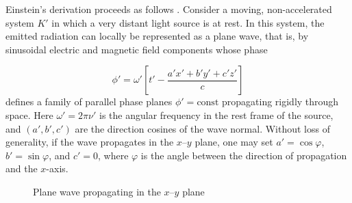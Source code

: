 \documentclass[submitted,12pt]{article} %
\begin{document}
Einstein’s derivation proceeds as follows \citep[910\psq]{Einstein1905}. Consider a moving, non-accelerated system $K'$ in which a very distant light source is at rest. In this system, the emitted radiation can locally be represented as a plane wave, that is, by sinusoidal electric and magnetic field components whose phase

\begin{equation*}
\phi'=\omega'\!\left[t'-\frac{a' x'+b' y'+c' z'}{c}\right]
\end{equation*}
defines a family of parallel phase planes $\phi'=\text{const}$ propagating rigidly through space. Here $\omega'=2\pi\nu'$ is the angular frequency in the rest frame of the source, and $(a',b',c')$ are the direction cosines of the wave normal. Without loss of generality, if the wave propagates in the $x$--$y$ plane, one may set $a'=\cos\varphi$, $b'=\sin\varphi$, and $c'=0$, where $\varphi$ is the angle between the direction of propagation and the $x$-axis.

\usetikzlibrary{calc}

\begin{figure}
\centering
{}
\caption{\label{fig:wave} Plane wave propagating in the $x$--$y$ plane}
\end{figure}
\end{document}

